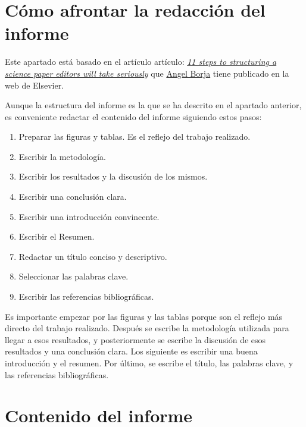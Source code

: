 \documentclass[11pt]{article}
\begin{document}
\section{Cómo afrontar la redacción del informe}
\label{sec:redaccion}

Este apartado está basado en el artículo artículo: \href{https://www.elsevier.com/connect/11-steps-to-structuring-a-science-paper-editors-will-take-seriously}{\itshape 11 steps to structuring a science paper editors will take seriously} que \href{https://www.linkedin.com/in/angel-borja-yerro-1320b76a/?originalSubdomain=es}{Angel Borja} tiene publicado en la web de Elsevier.

Aunque la estructura del informe es la que se ha descrito en el apartado anterior, es conveniente redactar el contenido del informe siguiendo estos pasos:

\begin{enumerate} \itemsep = 0ex %
    \item Preparar las figuras y tablas. Es el reflejo del trabajo realizado.
    \item Escribir la metodología.
    \item Escribir los resultados y la discusión de los mismos.
    \item Escribir una conclusión clara.
    \item Escribir una introducción convincente.
    \item Escribir el Resumen.
    \item Redactar un título conciso y descriptivo.
    \item Seleccionar las palabras clave.
    \item Escribir las referencias bibliográficas.
\end{enumerate}


Es importante empezar por las figuras y las tablas porque son el reflejo más directo del trabajo realizado. Después se escribe la metodología utilizada para llegar a esos resultados, y posteriormente se escribe la discusión de esos resultados y una conclusión clara. Los siguiente es escribir una buena introducción y el resumen. Por último, se escribe el título, las palabras clave, y las referencias bibliográficas.


\section{Contenido del informe}
\label{sec:contenido}
\end{document}
